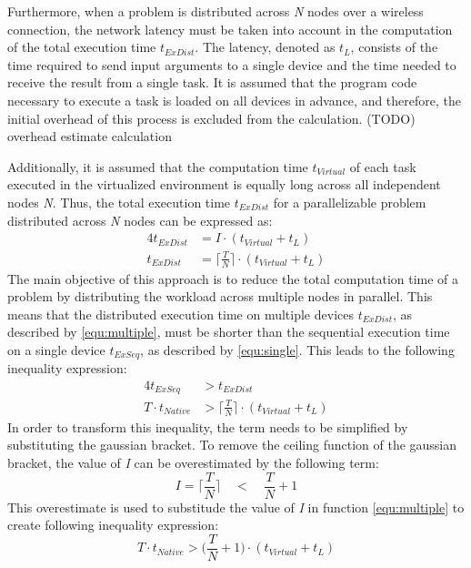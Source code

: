 Furthermore, when a problem is distributed across \emph{N} nodes over a wireless connection, the network latency must be taken into account in the computation of the total execution time $t_{ExDist}$. The latency, denoted as $t_{L}$, consists of the time required to send input arguments to a single device and the time needed to receive the result from a single task. It is assumed that the program code necessary to execute a task is loaded on all devices in advance, and therefore, the initial overhead of this process is excluded from the calculation. 
(TODO) overhead estimate calculation

Additionally, it is assumed that the computation time $t_{Virtual}$ of each task executed in the virtualized environment is equally long across all independent nodes \emph{N}. Thus, the total execution time $t_{ExDist}$ for a parallelizable problem distributed across \emph{N} nodes can be expressed as:
\begin{alignat}{4}
  t_{ExDist} &= I \cdot (t_{Virtual} + t_{L}) \nonumber \\
  t_{ExDist} &= \bigg\lceil\frac{T}{N}\bigg\rceil \cdot (t_{Virtual} + t_{L})
  \label{equ:multiple}
\end{alignat}
The main objective of this approach is to reduce the total computation time of a problem by distributing the workload across multiple nodes in parallel. This means that the distributed execution time on multiple devices $t_{ExDist}$, as described by \eqref{equ:multiple}, must be shorter than the sequential execution time on a single device $t_{ExSeq}$, as described by \eqref{equ:single}. This leads to the following inequality expression:
\begin{alignat}{4}
  t_{ExSeq} &> t_{ExDist} \nonumber \\
  T \cdot t_{Native} &> \bigg\lceil\frac{T}{N}\bigg\rceil \cdot (t_{Virtual} + t_{L})
  \label{equ:compare}
\end{alignat}
In order to transform this inequality, the term needs to be simplified by substituting the gaussian bracket. To remove the ceiling function of the gaussian bracket, the value of \emph{I} can be overestimated by the following term:
\begin{equation}
  I = \bigg\lceil\frac{T}{N}\bigg\rceil \quad < \quad \frac{T}{N} + 1
  \label{equ:frac2}
\end{equation}
This overestimate is used to substitude the value of \emph{I} in function \eqref{equ:multiple} to create following inequality expression:
\begin{equation}
  T \cdot t_{Native} > \bigg(\frac{T}{N} + 1\bigg) \cdot (t_{Virtual} + t_{L})
  \label{equ:substitution}
\end{equation}
